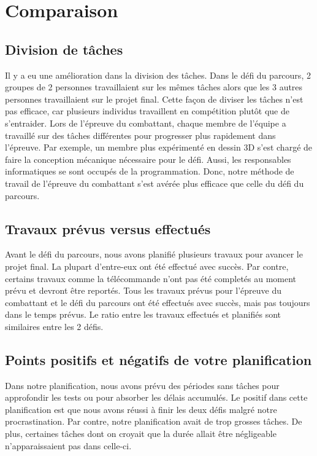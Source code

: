 \section{Comparaison}

\subsection{Division de tâches}

\begin{spacing}{1.5}
    Il y a eu une amélioration dans la division des tâches. Dans le défi du parcours, 2 groupes de 2 personnes travaillaient sur les mêmes tâches alors que les 3 autres personnes travaillaient sur le projet final. Cette façon de diviser les tâches n'est pas efficace, car plusieurs individus travaillent en compétition plutôt que de s'entraider. Lors de l'épreuve du combattant, chaque membre de l'équipe a travaillé sur des tâches différentes pour progresser plus rapidement dans l'épreuve. Par exemple, un membre plus expérimenté en dessin 3D s'est chargé de faire la conception mécanique nécessaire pour le défi. Aussi, les responsables informatiques se sont occupés de la programmation.  Donc, notre méthode de travail de l'épreuve du combattant s'est avérée plus efficace que celle du défi du parcours.
\end{spacing}

\subsection{Travaux prévus versus effectués}

\begin{spacing}{1.5}
    Avant le défi du parcours, nous avons planifié plusieurs travaux pour avancer le projet final. La plupart d'entre-eux ont été effectué avec succès. Par contre, certains travaux comme la télécommande n'ont pas été completés au moment prévu et devront être reportés. Tous les travaux prévus pour l'épreuve du combattant et le défi du parcours ont été effectués avec succès, mais pas toujours dans le temps prévus. Le ratio entre les travaux effectués et planifiés sont similaires entre les 2 défis.
\end{spacing}

\subsection{Points positifs et négatifs de votre planification}

\begin{spacing}{1.5}
    Dans notre planification, nous avons prévu des périodes sans tâches pour approfondir les tests ou pour absorber les délais accumulés. Le positif dans cette planification est que nous avons réussi à finir les deux défis malgré notre procrastination. Par contre, notre planification avait de trop grosses tâches. De plus, certaines tâches dont on croyait que la durée allait être négligeable n'apparaissaient pas dans celle-ci.
\end{spacing}

